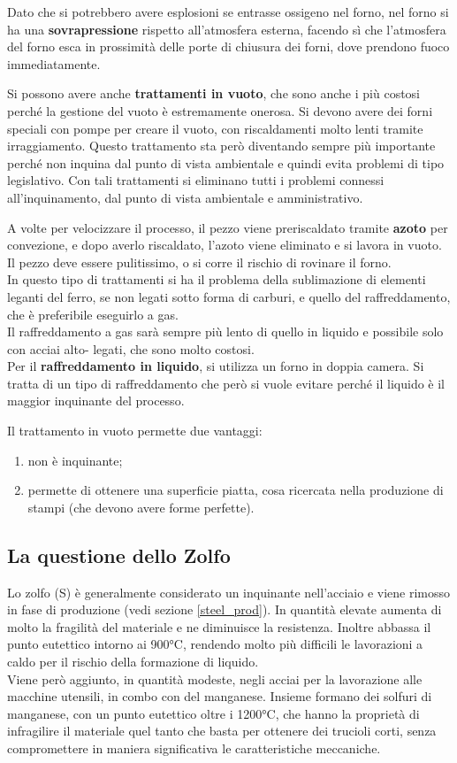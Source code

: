 Dato che si potrebbero avere esplosioni se entrasse ossigeno nel forno, nel forno si ha una \textbf{sovrapressione} rispetto all’atmosfera esterna, facendo sì che l’atmosfera del forno esca in prossimità delle porte di chiusura dei forni, dove prendono fuoco immediatamente.

Si possono avere anche \textbf{trattamenti in vuoto}, che sono anche i più costosi perché la gestione del vuoto è estremamente onerosa. Si devono avere dei forni speciali con pompe per creare il vuoto, con riscaldamenti molto lenti tramite irraggiamento. Questo trattamento sta però diventando sempre più importante perché non inquina dal punto di vista ambientale e quindi evita problemi di tipo legislativo. Con tali trattamenti si eliminano tutti i problemi connessi all’inquinamento, dal punto di vista ambientale e amministrativo.

A volte per velocizzare il processo, il pezzo viene preriscaldato tramite \textbf{azoto} per convezione, e dopo averlo riscaldato, l’azoto viene eliminato e si lavora in vuoto. Il pezzo deve essere pulitissimo, o si corre il rischio di rovinare il forno.\\
In questo tipo di trattamenti si ha il problema della sublimazione di elementi leganti del ferro, se non legati sotto forma di carburi, e quello del raffreddamento, che è preferibile eseguirlo a gas.\\
Il raffreddamento a gas sarà sempre più lento di quello in liquido e possibile solo con acciai alto- legati, che sono molto costosi.\\
Per il \textbf{raffreddamento in liquido}, si utilizza un forno in doppia camera. Si tratta di un tipo di raffreddamento che però si vuole evitare perché il liquido è il maggior inquinante del processo.

Il trattamento in vuoto permette due vantaggi:
\begin{enumerate}
    \item non è inquinante;
    \item permette di ottenere una superficie piatta, cosa ricercata nella produzione di stampi (che devono avere forme perfette).
\end{enumerate}

\subsection{La questione dello Zolfo}

Lo zolfo (S) è generalmente considerato un inquinante nell'acciaio e viene rimosso in fase di produzione (vedi sezione \ref{steel_prod}). In quantità elevate aumenta di molto la fragilità del materiale e ne diminuisce la resistenza. Inoltre abbassa il punto eutettico intorno ai 900°C, rendendo molto più difficili le lavorazioni a caldo per il rischio della formazione di liquido.\\
Viene però aggiunto, in quantità modeste, negli acciai per la lavorazione alle macchine utensili, in combo con del manganese. Insieme formano dei solfuri di manganese, con un punto eutettico oltre i 1200°C, che hanno la proprietà di infragilire il materiale quel tanto che basta per ottenere dei trucioli corti, senza compromettere in maniera significativa le caratteristiche meccaniche. 

